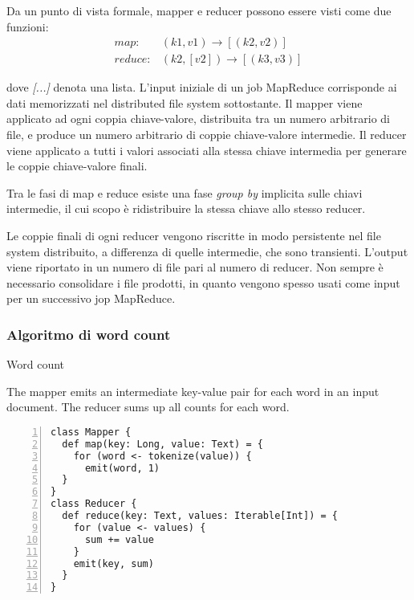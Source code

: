 \documentclass{article}
\begin{document}
Da un punto di vista formale, mapper e reducer possono essere visti come due funzioni:
\begin{align*}
    map:& (k1, v1) \rightarrow [(k2, v2)]\\
    reduce:& (k2, [v2]) \rightarrow [(k3, v3)]
\end{align*}

\noindent dove \textit{[...]} denota una lista. L'input iniziale di un job MapReduce corrisponde ai dati memorizzati nel distributed file system sottostante. Il mapper viene applicato ad ogni coppia chiave-valore, distribuita tra un numero arbitrario di file, e produce un numero arbitrario di coppie chiave-valore intermedie. Il reducer viene applicato a tutti i valori associati alla stessa chiave intermedia per generare le coppie chiave-valore finali. 

Tra le fasi di map e reduce esiste una fase \textit{group by} implicita sulle chiavi intermedie, il cui scopo è ridistribuire la stessa chiave allo stesso reducer.

Le coppie finali di ogni reducer vengono riscritte in modo persistente nel file system distribuito, a differenza di quelle intermedie, che sono transienti. L'output viene riportato in un numero di file pari al numero di reducer. Non sempre è necessario consolidare i file prodotti, in quanto vengono spesso usati come input per un successivo jop MapReduce. 

\subsubsection{Algoritmo di word count}

\begin{algorithm}[t]
\caption{Word count}

The mapper emits an intermediate key-value pair for each word in an
input document. The reducer sums up all counts for each word.
\begin{small}
\begin{Verbatim}[numbers=left, xleftmargin=7.5mm]
class Mapper {
  def map(key: Long, value: Text) = {
    for (word <- tokenize(value)) {
      emit(word, 1)
  }
}
class Reducer {
  def reduce(key: Text, values: Iterable[Int]) = {
    for (value <- values) {
      sum += value
    }
    emit(key, sum)
  }
}
\end{Verbatim}
\end{small}
\end{algorithm}
\end{document}
